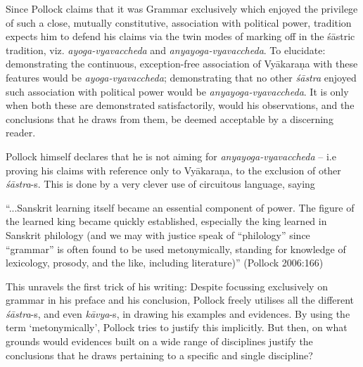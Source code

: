 Since Pollock claims that it was Grammar exclusively which enjoyed the privilege of such a close, mutually constitutive, association with political power, tradition expects him to defend his claims via the twin modes of marking off in the śāstric tradition, viz. {\sl ayoga-vyavaccheda} and {\sl anyayoga-vyavaccheda}. To elucidate: demonstrating the continuous, exception-free association of Vyākaraṇa with these features would be {\sl ayoga-vyavaccheda}; demonstrating that no other {\sl śāstra} enjoyed such association with political power would be {\sl anyayoga-vyavaccheda}. It is only when both these are demonstrated satisfactorily, would his observations, and the conclusions that he draws from them, be deemed acceptable by a discerning reader. 

Pollock himself declares that he is not aiming for {\sl anyayoga-vyavaccheda} -- i.e proving his claims with reference only to Vyākaraṇa, to the exclusion of other {\sl śāstra}-s. This is done by a very clever use of circuitous language, saying 
\begin{myquote}
``...Sanskrit learning itself became an essential component of power. The figure of the learned king became quickly established, especially the king learned in Sanskrit philology (and we may with justice speak of ``philology'' since ``grammar'' is often found to be used metonymically, standing for knowledge of lexicology, prosody, and the like, including literature)''
\hfill (Pollock 2006:166)
\end{myquote}

This unravels the first trick of his writing: Despite focussing exclusively on grammar in his preface and his conclusion, Pollock freely utilises all the different {\sl śāstra}-s, and even {\sl kāvya}-s, in drawing his examples and evidences. By using the term `metonymically', Pollock tries to justify this implicitly. But then, on what grounds would evidences built on a wide range of disciplines justify the conclusions that he draws pertaining to a specific and single discipline?

